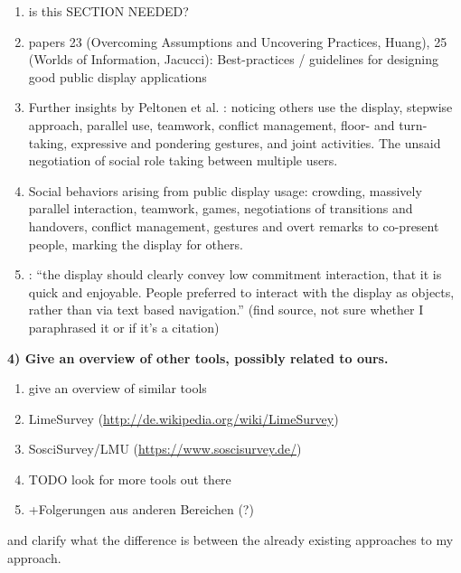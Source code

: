 		\begin{enumerate}
		\item is this SECTION NEEDED?

		\item papers 23 (Overcoming Assumptions and Uncovering Practices, Huang), 25 (Worlds of Information, Jacucci): Best-practices / guidelines for designing good public display applications


		\item Further insights by Peltonen et al. \cite{peltonen2008s}: noticing others use the display, stepwise approach, parallel use, teamwork, conflict management, floor- and turn-taking, expressive and pondering gestures, and joint activities. The unsaid negotiation of social role taking between multiple users.
		\item Social behaviors arising from public display usage: crowding, massively parallel interaction, teamwork, games, negotiations of transitions and handovers, conflict management, gestures and overt remarks to co-present people, marking the display for others. \cite{peltonen2008s}


		\item \cite{redhead2009designing}: ``the display should clearly convey low commitment interaction, that it is quick and enjoyable. People preferred to interact with the display as objects, rather than via text based navigation.'' (find source, not sure whether I paraphrased it or if it's a citation)

		\end{enumerate}



	\textbf{4) Give an overview of other tools, possibly related to ours.}

		\begin{enumerate}
		\item give an overview of similar tools
		\item LimeSurvey (\url{http://de.wikipedia.org/wiki/LimeSurvey})
		\item SosciSurvey/LMU (\url{https://www.soscisurvey.de/})
		\item TODO look for more tools out there
		\item +Folgerungen aus anderen Bereichen (?)
		\end{enumerate}

		and clarify what the difference is between the already existing approaches to my approach.





